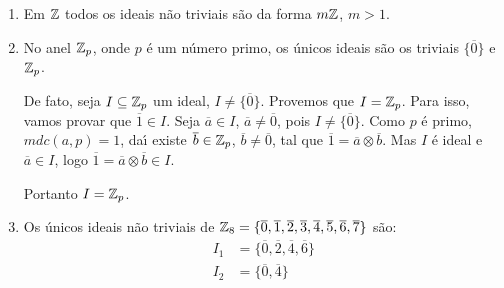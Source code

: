 \documentclass{beamer}
\begin{document}
    \begin{frame}
        \begin{exemplos}
            \begin{enumerate}[label={\arabic*})]
                \item Em $\mathbb{Z}$ todos os ideais n{\~a}o triviais s{\~a}o da forma $m\mathbb{Z}$, $m > 1$.
                \item No anel $\mathbb{Z}_p$, onde $p$ {\'e} um n{\'u}mero primo, os {\'u}nicos ideais  s{\~a}o os triviais $\{\overline{0}\}$ e $\mathbb{Z}_p$.
                
                De fato, seja $I \subseteq \mathbb{Z}_p$ um ideal, $I \neq \{\overline{0}\}$. Provemos que $I = \mathbb{Z}_p$. Para isso,
                vamos provar que $\overline{1} \in I$. Seja $\overline{a} \in I$, $\overline{a} \neq \overline{0}$, pois $I \neq \{\overline{0}\}$. Como $p$ {\'e} primo, $mdc(a,p) = 1$, da{\'\i} existe $\overline{b} \in \mathbb{Z}_p$, $\overline{b} \neq \overline{0}$, tal que $\overline{1} = \overline{a} \otimes \overline{b}$. Mas $I$ {\'e} ideal e $\overline{a} \in I$, logo $\overline{1} = \overline{a} \otimes \overline{b} \in I$.

                Portanto $I = \mathbb{Z}_p$.

                \item Os {\'u}nicos ideais n{\~a}o triviais de $\mathbb{Z}_8 = \{\overline{0}, \overline{1}, \overline{2}, \overline{3}, \overline{4}, \overline{5}, \overline{6}, \overline{7}\}$ s{\~a}o:
                \begin{align*}
                    I_1 &= \{\overline{0}, \overline{2}, \overline{4}, \overline{6}\}\\
                    I_2 &=\{\overline{0}, \overline{4}\}
                \end{align*}
            \end{enumerate}
        \end{exemplos}
    \end{frame}
\end{document}
